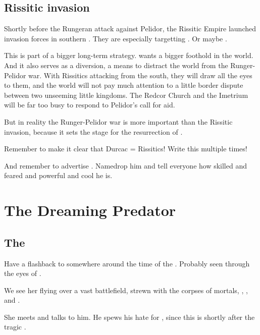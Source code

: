 \begin{garbage}
\subsection{Rissitic invasion}
Shortly before the Rungeran attack against Pelidor, the Rissitic Empire launched invasion forces in southern \Galessan. 
They are especially targetting . 
Or maybe \Scyrum. 

This is part of a bigger long-term strategy. 
\Secherdamon{} wants a bigger foothold in the world. 
And it also serves as a diversion, a means to distract the world from the Runger-Pelidor war. 
With Rissitics attacking from the south, they will draw all the eyes to them, and the world will not pay much attention to a little border dispute between two unseeming little kingdoms. 
The Redcor Church and the Imetrium will be far too busy to respond to Pelidor's call for aid. 

But in reality the Runger-Pelidor war is more important than the Rissitic invasion, because it sets the stage for the resurrection of \Nithdornazsh. 

Remember to make it clear that Durcac = Rissitics! 
Write this multiple times! 

And remember to advertise . 
Namedrop him and tell everyone how skilled and feared and powerful and cool he is. 
















\section{The Dreaming Predator}
\subsection{The \SecondShrouding}
Have a flashback to somewhere around the time of the \hs{\SecondShrouding}. 
Probably seen through the eyes of \Nzessuacrith. 

We see her flying over a vast battlefield, strewn with the corpses of mortals, \dragons{}, \cuezcans, \banes{} and \resphain. 

She meets \Secherdamon{} and talks to him. 
He spews his hate for \Ishnaruchaefir{}, since this is shortly after the tragic . 


\end{garbage}
